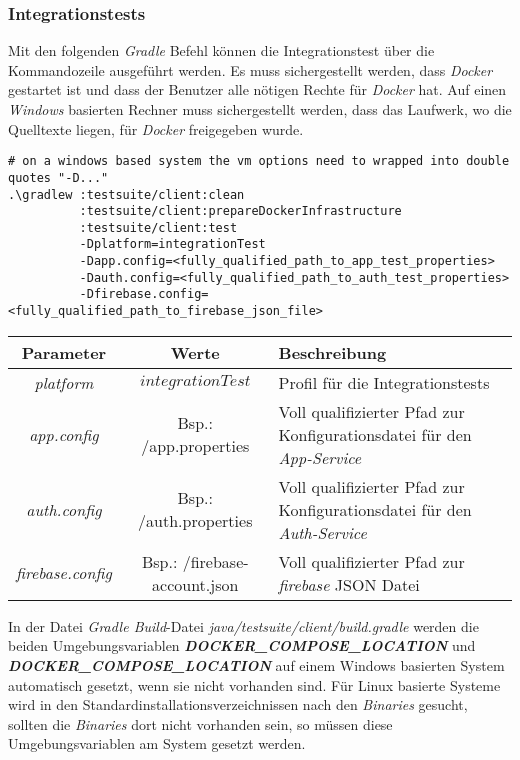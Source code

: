 \documentclass[]{article}
\begin{document}
{{{\subsubsection{Integrationstests}
Mit den folgenden \emph{Gradle} Befehl können die Integrationstest über die Kommandozeile ausgeführt werden. Es muss sichergestellt werden, dass \emph{Docker} gestartet ist und dass der Benutzer alle nötigen Rechte für \emph{Docker} hat. Auf einen \emph{Windows} basierten Rechner muss sichergestellt werden, dass das Laufwerk, wo die Quelltexte liegen, für \emph{Docker} freigegeben wurde. 
\begin{verbatim}
# on a windows based system the vm options need to wrapped into double quotes "-D..."
.\gradlew :testsuite/client:clean 
          :testsuite/client:prepareDockerInfrastructure 
          :testsuite/client:test
          -Dplatform=integrationTest
          -Dapp.config=<fully_qualified_path_to_app_test_properties> 
          -Dauth.config=<fully_qualified_path_to_auth_test_properties> 
          -Dfirebase.config=<fully_qualified_path_to_firebase_json_file>
\end{verbatim}
{\renewcommand{\arraystretch}{2}%
\begin{center}
	\begin{tabular}{| c | c | p{8.3cm} |}
		\hline
		\textbf{Parameter} & \textbf{Werte} & \textbf{Beschreibung}  \\ \hline
		\textit{platform} & $integrationTest$ & Profil für die Integrationstests\\ \hline
		\textit{app.config} & Bsp.: /app.properties & Voll qualifizierter Pfad zur Konfigurationsdatei für den \emph{App-Service}  \\ \hline
		\textit{auth.config} & Bsp.: /auth.properties & Voll qualifizierter Pfad zur Konfigurationsdatei für den \emph{Auth-Service}  \\ \hline
		\textit{firebase.config} & Bsp.: /firebase-account.json & Voll qualifizierter Pfad zur 
		\emph{firebase} JSON Datei  \\ \hline
	\end{tabular}
\end{center}
In der Datei \emph{Gradle Build}-Datei \emph{java/testsuite/client/build.gradle} werden die beiden Umgebungsvariablen \textbf{\emph{DOCKER\_COMPOSE\_LOCATION}} und  \textbf{\emph{DOCKER\_COMPOSE\_LOCATION}} auf einem Windows basierten System automatisch gesetzt, wenn sie nicht vorhanden sind. Für Linux basierte Systeme wird in den Standardinstallationsverzeichnissen nach den \emph{Binaries} gesucht, sollten die \emph{Binaries} dort nicht vorhanden sein, so müssen diese Umgebungsvariablen am System gesetzt werden. 

}}}}
\end{document}
